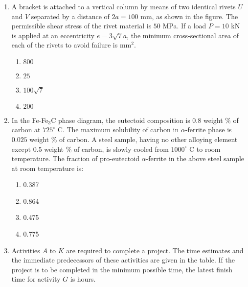 \documentclass[journal,12pt,onecolumn]{IEEEtran}
\theoremstyle{remark}
\begin{document}
\begin{enumerate}
    \item A bracket is attached to a vertical column by means of two identical rivets $U$ and $V$ separated by a distance of $2a = 100$ mm, as shown in the figure. The permissible shear stress of the rivet material is $50$ MPa. If a load $P = 10$ kN is applied at an eccentricity $e = 3\sqrt{7}a$, the minimum cross-sectional area of each of the rivets to avoid failure is {\underline{\hspace{2cm}}} mm$^2$.
     \begin{figure}[H]
        \centering
    \end{figure}
       
   
    \begin{enumerate}
        \item $800$
        \item $25$
        \item $100\sqrt{7}$
        \item $200$
    \end{enumerate}

    \item In the Fe-Fe$_3$C phase diagram, the eutectoid composition is $0.8$ weight $\%$ of carbon at $725^\circ$ C. The maximum solubility of carbon in $\alpha$-ferrite phase is $0.025$ weight $\%$ of carbon. A steel sample, having no other alloying element except $0.5$ weight $\%$ of carbon, is slowly cooled from $1000^\circ$ C to room temperature. The fraction of pro-eutectoid $\alpha$-ferrite in the above steel sample at room temperature is:
    \begin{enumerate}
        \item 0.387
        \item 0.864
        \item 0.475
        \item 0.775
    \end{enumerate}

    \item Activities $A$ to $K$ are required to complete a project. The time estimates and the immediate predecessors of these activities are given in the table. If the project is to be completed in the minimum possible time, the latest finish time for activity $G$ is {\underline{\hspace{2cm}}} hours.
     \begin{figure}[H]
        \centering
    \end{figure}
       

\end{enumerate}
\end{document}
